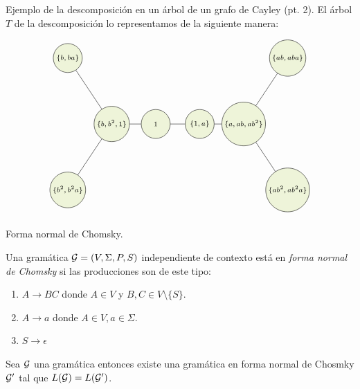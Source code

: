 \documentclass[aspectratio=169, 11pt]{beamer}
\begin{document}
	\begin{frame}[fragile]{Ejemplo de la descomposición en un árbol de un grafo de Cayley (pt. 2).}
		El árbol $T$ de la descomposición lo representamos de la siguiente manera:

	\[
			\begin{tikzpicture}[scale=0.8, V/.style = {circle, draw,align= center, minimum size=0.5cm,
			minimum size=3em,inner sep=2,
			fill=applegreen!15,font=\scriptsize	},fill fraction/.style={path picture={
				\fill[#1] 
				(path picture bounding box.south) rectangle
				(path picture bounding box.north west);
		}},
		fill fraction/.default=gray!50
		]
		\node[align=center] at (2, -6) {};
		\begin{scope}[nodes=V,xshift=4.5cm, yshift=-4cm]
			\node (1) at (0,0)  {$\{ b,b^2,1 \}$};
			\node (2) at (2,0)  {$1$};
			\node (3) at (4,0)  {$\{ 1,a \}$};
			\node (4) at (-2,3)     {$\{ b,ba \}$};
			\node (5) at (-2,-3)   {$\{b^2,b^2a\}$};
			\node (6) at (6,0)  {$\{ a,ab,ab^2 \}$};
			
			\node (9) at (8,3)  {$\{ab,aba\}$};
			\node (10) at (8,-3)  {$\{ ab^2, ab^2a \}$};
		\end{scope}
		
		
		\draw (1) edge[-] (2);
		\draw (2) edge[-] (3);
		\draw (1) edge[-] (5);
		\draw (1) edge[-] (4);
		\draw (3) edge[-] (6);
		\draw (6) edge[-] (9);
		\draw (6) edge[-] (10);
	\end{tikzpicture}
	\]
	\end{frame}

	\begin{frame}[fragile]{Forma normal de Chomsky.}
		\begin{deff}
			Una gramática ${\cal G} = (V, \Sigma, P, S)$ independiente de contexto está en \emph{forma normal de Chomsky} si las producciones son de este tipo:
			\begin{enumerate}
				\item $A \to BC$ donde $A\in V$ y $B,C \in V \setminus \{ S \}$.
				\item $A \to a$ donde $A \in V, a \in \Sigma$.
				\item $S \to \epsilon$ 
			\end{enumerate}
		\end{deff}
		\begin{teo}
			Sea ${\cal G}$ una gramática \ic{} entonces existe una gramática \ic{} en forma normal de Chosmky ${\cal G}'$ tal que $L({\cal G}) = L({\cal G}')$.
		\end{teo}

	\end{frame}
\end{document}
